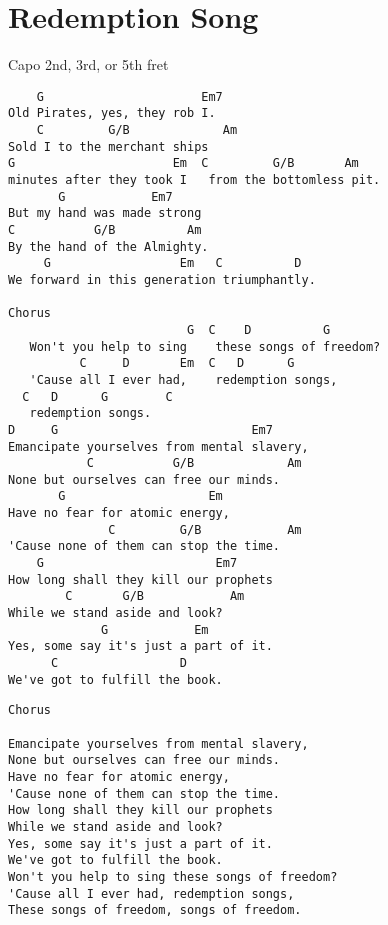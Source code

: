 \documentclass[leqno]{memoir}
\begin{document}
\chapter{Redemption Song}
Capo 2nd, 3rd, or 5th fret
\begin{verbatim}
    G                      Em7
Old Pirates, yes, they rob I.
    C         G/B             Am
Sold I to the merchant ships
G                      Em  C         G/B       Am
minutes after they took I   from the bottomless pit.
       G            Em7
But my hand was made strong
C           G/B          Am
By the hand of the Almighty.
     G                  Em   C          D
We forward in this generation triumphantly.

Chorus
                         G  C    D          G
   Won't you help to sing    these songs of freedom?
          C     D       Em  C   D      G
   'Cause all I ever had,    redemption songs,
  C   D      G        C
   redemption songs.
D     G                           Em7
Emancipate yourselves from mental slavery,
           C           G/B             Am
None but ourselves can free our minds.
       G                    Em
Have no fear for atomic energy,
              C         G/B            Am
'Cause none of them can stop the time.
    G                        Em7
How long shall they kill our prophets
        C       G/B            Am
While we stand aside and look?
             G            Em
Yes, some say it's just a part of it.
      C                 D
We've got to fulfill the book.

\end{verbatim}
\newpage
\begin{verbatim}
Chorus

Emancipate yourselves from mental slavery,
None but ourselves can free our minds.
Have no fear for atomic energy,
'Cause none of them can stop the time.
How long shall they kill our prophets
While we stand aside and look?
Yes, some say it's just a part of it.
We've got to fulfill the book.
Won't you help to sing these songs of freedom?
'Cause all I ever had, redemption songs,
These songs of freedom, songs of freedom.


\end{verbatim}
\newpage
\end{document}
